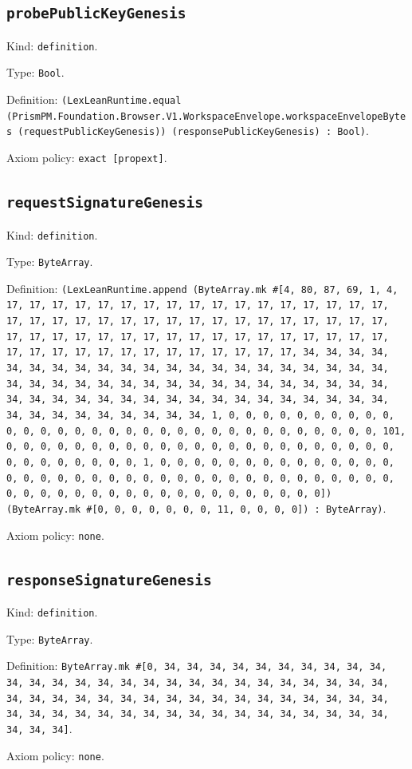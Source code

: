 \documentclass[11pt]{article}
\begin{document}
\subsection*{\texttt{probePublicKeyGenesis}}
\noindent Kind: \texttt{definition}.\par
\noindent Type: \texttt{Bool}.\par
\noindent Definition: \texttt{(LexLeanRuntime.equal (PrismPM.Foundation.Browser.V1.WorkspaceEnvelope.workspaceEnvelopeBytes (requestPublicKeyGenesis)) (responsePublicKeyGenesis) : Bool)}.\par
\noindent Axiom policy: \texttt{exact [propext]}.\par
\subsection*{\texttt{requestSignatureGenesis}}
\noindent Kind: \texttt{definition}.\par
\noindent Type: \texttt{ByteArray}.\par
\noindent Definition: \texttt{(LexLeanRuntime.append (ByteArray.mk \#[4, 80, 87, 69, 1, 4, 17, 17, 17, 17, 17, 17, 17, 17, 17, 17, 17, 17, 17, 17, 17, 17, 17, 17, 17, 17, 17, 17, 17, 17, 17, 17, 17, 17, 17, 17, 17, 17, 17, 17, 17, 17, 17, 17, 17, 17, 17, 17, 17, 17, 17, 17, 17, 17, 17, 17, 17, 17, 17, 17, 17, 17, 17, 17, 17, 17, 17, 17, 17, 17, 34, 34, 34, 34, 34, 34, 34, 34, 34, 34, 34, 34, 34, 34, 34, 34, 34, 34, 34, 34, 34, 34, 34, 34, 34, 34, 34, 34, 34, 34, 34, 34, 34, 34, 34, 34, 34, 34, 34, 34, 34, 34, 34, 34, 34, 34, 34, 34, 34, 34, 34, 34, 34, 34, 34, 34, 34, 34, 34, 34, 34, 34, 34, 34, 1, 0, 0, 0, 0, 0, 0, 0, 0, 0, 0, 0, 0, 0, 0, 0, 0, 0, 0, 0, 0, 0, 0, 0, 0, 0, 0, 0, 0, 0, 0, 0, 0, 101, 0, 0, 0, 0, 0, 0, 0, 0, 0, 0, 0, 0, 0, 0, 0, 0, 0, 0, 0, 0, 0, 0, 0, 0, 0, 0, 0, 0, 0, 0, 0, 1, 0, 0, 0, 0, 0, 0, 0, 0, 0, 0, 0, 0, 0, 0, 0, 0, 0, 0, 0, 0, 0, 0, 0, 0, 0, 0, 0, 0, 0, 0, 0, 0, 0, 0, 0, 0, 0, 0, 0, 0, 0, 0, 0, 0, 0, 0, 0, 0, 0, 0, 0, 0, 0, 0, 0, 0]) (ByteArray.mk \#[0, 0, 0, 0, 0, 0, 0, 11, 0, 0, 0, 0]) : ByteArray)}.\par
\noindent Axiom policy: \texttt{none}.\par
\subsection*{\texttt{responseSignatureGenesis}}
\noindent Kind: \texttt{definition}.\par
\noindent Type: \texttt{ByteArray}.\par
\noindent Definition: \texttt{ByteArray.mk \#[0, 34, 34, 34, 34, 34, 34, 34, 34, 34, 34, 34, 34, 34, 34, 34, 34, 34, 34, 34, 34, 34, 34, 34, 34, 34, 34, 34, 34, 34, 34, 34, 34, 34, 34, 34, 34, 34, 34, 34, 34, 34, 34, 34, 34, 34, 34, 34, 34, 34, 34, 34, 34, 34, 34, 34, 34, 34, 34, 34, 34, 34, 34, 34, 34]}.\par
\noindent Axiom policy: \texttt{none}.\par
\end{document}
